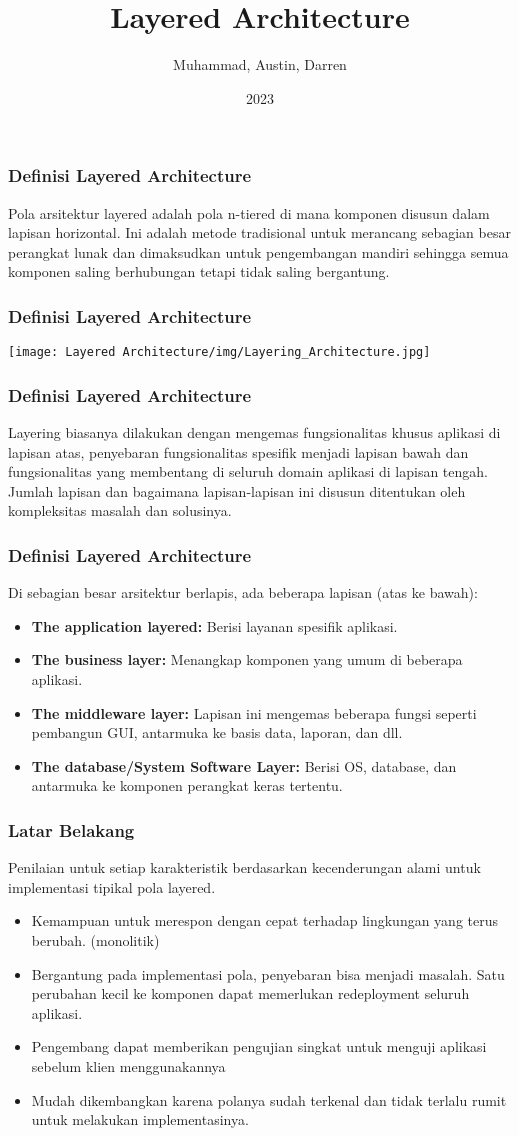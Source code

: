 \documentclass{beamer}
\title{Layered Architecture}
\author{Muhammad, Austin, Darren}
\institute{Pradita University}
\date{2023}
\begin{document}
\frame{\titlepage}

\begin{frame}
\frametitle{Definisi Layered Architecture}
Pola arsitektur layered adalah pola n-tiered di mana komponen disusun dalam lapisan horizontal. Ini adalah metode tradisional untuk merancang sebagian besar perangkat lunak dan dimaksudkan untuk pengembangan mandiri sehingga semua komponen saling berhubungan tetapi tidak saling bergantung.
\end{frame}

\begin{frame}
\frametitle{Definisi Layered Architecture}
\texttt{[image: Layered Architecture/img/Layering\_Architecture.jpg]}

\end{frame}

\begin{frame}
\frametitle{Definisi Layered Architecture}
Layering biasanya dilakukan dengan mengemas fungsionalitas khusus aplikasi di lapisan atas, penyebaran fungsionalitas spesifik menjadi lapisan bawah dan fungsionalitas yang membentang di seluruh domain aplikasi di lapisan tengah. Jumlah lapisan dan bagaimana lapisan-lapisan ini disusun ditentukan oleh kompleksitas masalah dan solusinya.
\end{frame}

\begin{frame}
\frametitle{Definisi Layered Architecture}
Di sebagian besar arsitektur berlapis, ada beberapa lapisan (atas ke bawah):
\begin{itemize}
	\item \textbf{The application layered:} Berisi layanan spesifik aplikasi.
	\item \textbf{The business layer:} Menangkap komponen yang umum di beberapa aplikasi.
	\item \textbf{The middleware layer:} Lapisan ini mengemas beberapa fungsi seperti pembangun GUI, antarmuka ke basis data, laporan, dan dll.
	\item \textbf{The database/System Software Layer:} Berisi OS, database, dan antarmuka ke komponen perangkat keras tertentu.
\end{itemize}
\end{frame}

\begin{frame}
\frametitle{Latar Belakang}
Penilaian untuk setiap karakteristik berdasarkan kecenderungan alami untuk implementasi tipikal pola layered.
\begin{itemize}
	\item Kemampuan untuk merespon dengan cepat terhadap lingkungan yang terus berubah. (monolitik)
	\item Bergantung pada implementasi pola, penyebaran bisa menjadi masalah. Satu perubahan kecil ke komponen dapat memerlukan redeployment seluruh aplikasi.
	\item Pengembang dapat memberikan pengujian singkat untuk menguji aplikasi sebelum klien menggunakannya
	\item Mudah dikembangkan karena polanya sudah terkenal dan tidak terlalu rumit untuk melakukan implementasinya.
\end{itemize}
\end{frame}
\end{document}
